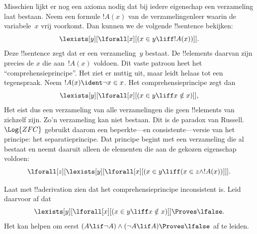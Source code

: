 \documentclass[../../../include/open-logic-section]{subfiles}
\begin{document}
Misschien lijkt er nog een axioma nodig dat bij iedere eigenschap een
verzameling laat bestaan. Neem een formule $!A(x)$ van de
verzamelingenleer waarin de variabele~$x$ vrij voorkomt. Dan kunnen we
de volgende !!{sentence} bekijken:
\[
\lexists[y][\lforall[x][(x \in y \liff !A(x))]].
\]
Deze !!{sentence} zegt dat er een verzameling~$y$ bestaat. De
!!{element}s daarvan zijn precies de $x$ die aan~$!A(x)$ voldoen. Dit
vaste patroon heet het ``comprehensieprincipe''. Het ziet er nuttig uit,
maar leidt helaas tot een tegenspraak. Neem $!A(x) \ident \lnot x \in
x$. Het comprehensieprincipe zegt dan
\[
\lexists[y][\lforall[x][(x \in y \liff x \notin x)]],
\]
Het eist dus een verzameling van alle verzamelingen die geen
!!{element}s van zichzelf zijn. Zo'n verzameling kan niet bestaan. Dit
is de paradox van Russell. $\Log{ZFC}$ gebruikt daarom een
beperkte---en consistente---versie van het principe: het
separatieprincipe. Dat principe begint met een verzameling die al
bestaat en neemt daaruit alleen de elementen die aan de gekozen
eigenschap voldoen:
\[
\lforall[z][\lexists[y][\lforall[x][(x \in y \liff (x \in z \land
      !A(x))]]].
\]

\begin{prob}
Laat met !!a{derivation} zien dat het comprehensieprincipe inconsistent
is. Leid daarvoor af dat
\[
\lexists[y][\lforall[x][(x \in y \liff x \notin x)]] \Proves \lfalse.
\]
Het kan helpen om eerst $(A \lif \lnot A) \land (\lnot A \lif A)
\Proves \lfalse$ af te leiden.
\end{prob}
\end{document}
